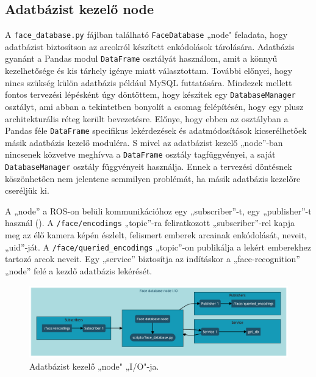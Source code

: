 
\subsection{Adatbázist kezelő node}
A \verb|face_database.py| fájlban található \verb|FaceDatabase| „node" feladata, hogy adatbázist biztosítson az arcokról készített enkódolások tárolására. Adatbázis gyanánt a Pandas modul \verb|DataFrame| osztályát használom, amit a könnyű kezelhetősége és kis tárhely igénye miatt választottam. További előnyei, hogy nincs szükség külön adatbázis például MySQL futtatására. Mindezek mellett fontos tervezési lépésként úgy döntöttem, hogy készítek egy \verb|DatabaseManager| osztályt, ami abban a tekintetben bonyolít a csomag felépítésén, hogy egy plusz architekturális réteg került bevezetésre. Előnye, hogy ebben az osztályban a Pandas féle \verb|DataFrame| specifikus lekérdezések és adatmódosítások kicserélhetőek másik adatbázis kezelő moduléra. S mivel az adatbázist kezelő „node”-ban nincsenek közvetve meghívva a \verb|DataFrame| osztály tagfüggvényei, a saját \verb|DatabaseManager| osztály függvényeit használja. Ennek a tervezési döntésnek köszönhetően nem jelentene semmilyen problémát, ha másik adatbázis kezelőre cseréljük ki. 

A „node” a ROS-on belüli kommunikációhoz egy „subscriber”-t, egy „publisher”-t használ (). A \verb|/face/encodings| „topic”-ra feliratkozott „subscriber”-rel kapja meg az élő kamera képén észlelt, felismert emberek arcainak enkódolását, neveit, „uid”-ját. A \verb|/face/queried_encodings| „topic”-on publikálja a lekért emberekhez tartozó arcok neveit. Egy „service” biztosítja az indításkor a „face-recognition” „node” felé a kezdő adatbázis lekérését.

\begin{figure}[!ht]
    \centering
    \includegraphics[width=150mm, keepaspectratio]{02_mermaid/mermaid30_db_io.png}
    \caption{Adatbázist kezelő „node" „I/O"-ja.}
    \label{fig:dbio}
\end{figure}

